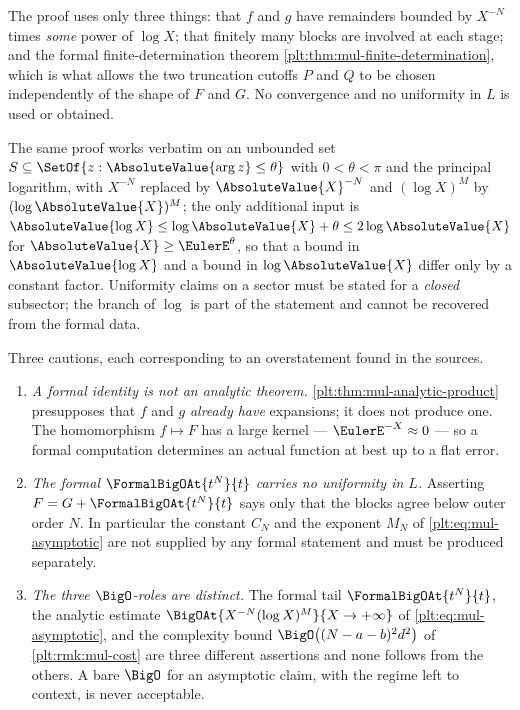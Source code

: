 \begin{remark}
\label{plt:rmk:mul-analytic-hypotheses}
The proof uses only three things: that $f$ and $g$ have remainders bounded by
$X^{-N}$ times \emph{some} power of $\log X$; that finitely many blocks are
involved at each stage; and the formal finite-determination theorem
\cref{plt:thm:mul-finite-determination}, which is what allows the two
truncation cutoffs $P$ and $Q$ to be chosen independently of the shape of
$F$ and $G$.  No convergence and no uniformity in $L$ is used or obtained.

The same proof works verbatim on an unbounded set
$S\subseteq\SetOf{z:\AbsoluteValue{\arg z}\le\theta}$ with
$0<\theta<\pi$ and the principal logarithm, with $X^{-N}$ replaced by
$\AbsoluteValue{X}^{-N}$ and $(\log X)^{M}$ by
$(\log\AbsoluteValue{X})^{M}$; the only additional input is
$\AbsoluteValue{\log X}\le\log\AbsoluteValue{X}+\theta
\le2\log\AbsoluteValue{X}$ for $\AbsoluteValue{X}\ge\EulerE^{\theta}$, so
that a bound in $\AbsoluteValue{\log X}$ and a bound in
$\log\AbsoluteValue{X}$ differ only by a constant factor.  Uniformity claims
on a sector must be stated for a \emph{closed} subsector; the branch of
$\log$ is part of the statement and cannot be recovered from the formal
data.
\end{remark}

\begin{warningbox}
Three cautions, each corresponding to an overstatement found in the sources.
\begin{enumerate}
\item \emph{A formal identity is not an analytic theorem.}
\cref{plt:thm:mul-analytic-product} presupposes that $f$ and $g$
\emph{already have} expansions; it does not produce one.  The
homomorphism $f\mapsto F$ has a large kernel --- $\EulerE^{-X}\approx0$ ---
so a formal computation determines an actual function at best up to a flat
error.
\item \emph{The formal $\FormalBigOAt{t^N}{t}$ carries no uniformity in $L$.}
Asserting $F=G+\FormalBigOAt{t^N}{t}$ says only that the blocks agree below
outer order $N$.  In particular the constant $C_N$ and the exponent $M_N$ of
\eqref{plt:eq:mul-asymptotic} are not supplied by any formal statement and
must be produced separately.
\item \emph{The three $\BigO$-roles are distinct.}  The formal tail
$\FormalBigOAt{t^N}{t}$, the analytic estimate
$\BigOAt{X^{-N}(\log X)^{M}}{X\to+\infty}$ of
\eqref{plt:eq:mul-asymptotic}, and the complexity bound
$\BigO\bigl((N-a-b)^2d^2\bigr)$ of \cref{plt:rmk:mul-cost} are three
different assertions and none follows from the others.  A bare $\BigO$ for an
asymptotic claim, with the regime left to context, is never acceptable.
\end{enumerate}
\end{warningbox}

